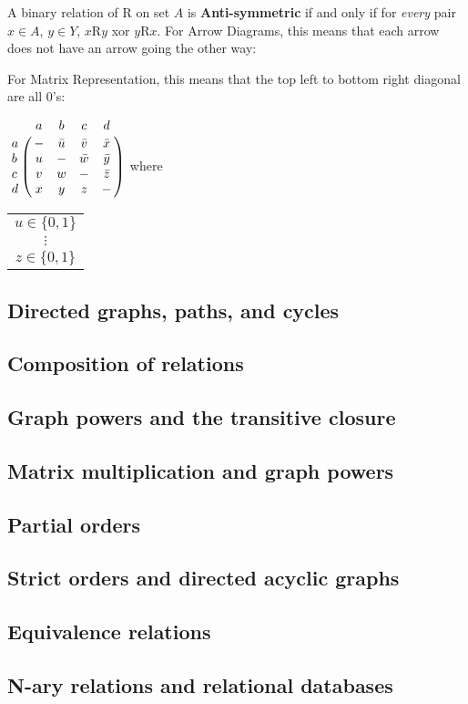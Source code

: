 A binary relation of R on set $A$ is \textbf{Anti-symmetric} if and only if for \textit{every} pair $x \in A$, $y \in Y$, $x$R$y$ xor $y$R$x$.
For Arrow Diagrams, this means that each arrow does not have an arrow going the other way:
\begin{center}
\end{center}
For Matrix Representation, this means that the top left to bottom right diagonal are all 0's:
\begin{center}
  $
    \bordermatrix{ & a & b & c & d \cr
      a & - & \bar{u} & \bar{v} & \bar{x} \cr
      b & u & - & \bar{w} & \bar{y} \cr
      c & v & w & - & \bar{z} \cr
      d & x & y & z & - \cr }
  $
  where
  \begin{tabular}{c}
    $u \in \{0,1\}$ \\
    $\vdots$        \\
    $z \in \{0,1\}$
  \end{tabular}
\end{center}

\subsection{Directed graphs, paths, and cycles}
\subsection{Composition of relations}
\subsection{Graph powers and the transitive closure}
\subsection{Matrix multiplication and graph powers}
\subsection{Partial orders}
\subsection{Strict orders and directed acyclic graphs}
\subsection{Equivalence relations}
\subsection{N-ary relations and relational databases}